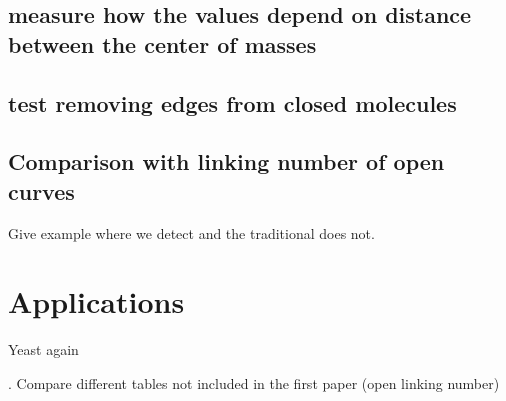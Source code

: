 \documentclass{iopart}
\begin{document}
\subsection{measure how the values depend on distance between the center of masses}
\subsection{ test removing edges from closed molecules}
\subsection{Comparison  with linking number of open curves}
Give example where we detect and the traditional does not. 






\medskip
\section{Applications}
Yeast again

. Compare different tables not included in the first paper (open linking number) 
\end{document}
